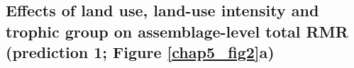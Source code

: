 
\subsection{Effects of land use, land-use intensity and trophic group on assemblage-level total RMR (prediction 1; Figure \ref{chap5_fig2}a)}

